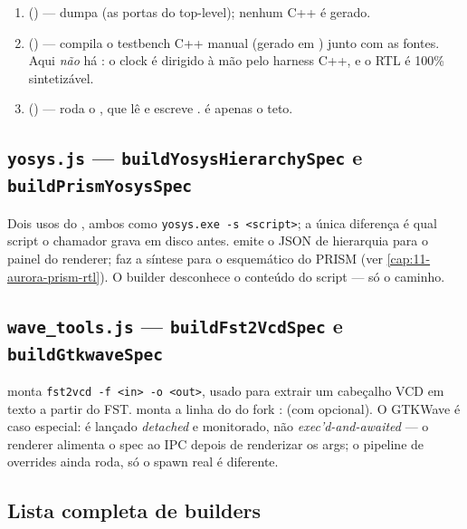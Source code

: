\begin{enumerate}[leftmargin=1.6em]
  \item {} () — 
    dumpa  (as portas do top-level); nenhum C++ é gerado.
  \item {} () —
     compila o testbench C++ manual (gerado em
    ) junto com as fontes. Aqui \emph{não} há
    : o clock é dirigido à mão pelo harness C++, e o RTL é 100\%
    sintetizável.
  \item {} () — roda o
    , que lê  e escreve
    .  é apenas o teto.
\end{enumerate}

\subsection{\texttt{yosys.js} — \texttt{buildYosysHierarchySpec} e \texttt{buildPrismYosysSpec}}

Dois usos do , ambos como \lstinline|yosys.exe -s <script>|; a única
diferença é qual script o chamador grava em disco antes. 
emite o JSON de hierarquia para o painel do renderer;  faz a
síntese para o esquemático do PRISM (ver \autoref{cap:11-aurora-prism-rtl}). O
builder desconhece o conteúdo do script — só o caminho.

\subsection{\texttt{wave\_tools.js} — \texttt{buildFst2VcdSpec} e \texttt{buildGtkwaveSpec}}

 monta \lstinline|fst2vcd -f <in> -o <out>|, usado para
extrair um cabeçalho VCD em texto a partir do FST.  monta
a linha do  do fork :
 (com  opcional). O
GTKWave é caso especial: é lançado \emph{detached} e monitorado, não
\emph{exec'd-and-awaited} — o renderer alimenta o spec ao IPC
 depois de renderizar os args; o pipeline de overrides
ainda roda, só o spawn real é diferente.

\subsection{Lista completa de builders}

